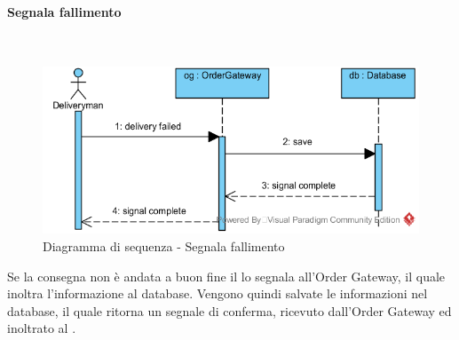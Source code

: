 \begin{samepage}
\paragraph{Segnala fallimento}\mbox{}\\
\end{samepage}
\begin{figure}[H]
	\centering
	\includegraphics[width=15cm]{../../documenti/SpecificaTecnica/diagrammi/sequenza/fattorino_fallimento_consegna.png}
	\caption{Diagramma di sequenza - Segnala fallimento}
\end{figure}
Se la consegna non è andata a buon fine il \Deliveryman{} lo segnala all'Order Gateway, il quale inoltra l'informazione al database. Vengono quindi salvate le informazioni nel database, il quale ritorna un segnale di conferma, ricevuto dall'Order Gateway ed inoltrato al \Deliveryman{}.

\subsubsection{\Purchasingmanager{}}

